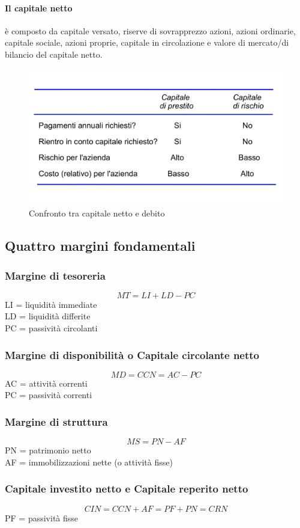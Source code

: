 \documentclass{report}
\begin{document}
	\paragraph{Il capitale netto} è composto da capitale versato, riserve di sovrapprezzo azioni, azioni ordinarie, capitale sociale, azioni proprie, capitale in circolazione e valore di mercato/di bilancio del capitale netto.
	\begin{figure}[h]
		\centering
		\includegraphics[width=0.7\linewidth]{images/confronto-capitali}
		\caption{Confronto tra capitale netto e debito}
		\label{fig:confronto-capitali}
	\end{figure}
	\subsection{Quattro margini fondamentali}
	\subsubsection{Margine di tesoreria}
	\[MT = LI + LD - PC\]
	LI = liquidità immediate\\LD = liquidità differite\\PC = passività circolanti
	\subsubsection{Margine di disponibilità o Capitale circolante netto}
	\[MD = CCN = AC - PC\]
	AC = attività correnti\\PC = passività correnti
	\subsubsection{Margine di struttura}
	\[MS = PN - AF\]
	PN = patrimonio netto\\AF = immobilizzazioni nette (o attività fisse)
	\subsubsection{Capitale investito netto e Capitale reperito netto}
	\[CIN = CCN + AF = PF + PN = CRN\]
	PF = passività fisse
\end{document}
